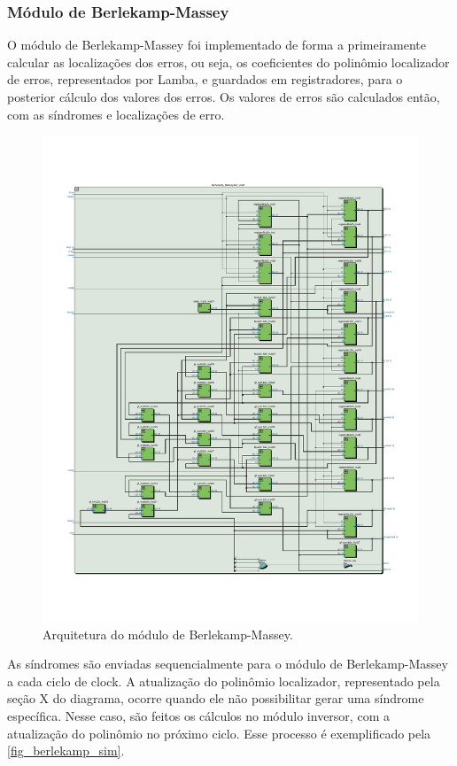 	\subsubsection{Módulo de Berlekamp-Massey}
	
	O módulo de Berlekamp-Massey foi implementado de forma a primeiramente calcular as localizações dos erros, ou seja, os coeficientes do polinômio localizador de erros, representados por Lamba, e guardados em registradores, para o posterior cálculo dos valores dos erros. Os valores de erros são calculados então, com as síndromes e localizações de erro.
	
	\begin{figure}[!htb]
		\caption{\label{fig_berlekamp_arq}Arquitetura do módulo de Berlekamp-Massey.}
		\centering
		\includegraphics[width=1\textwidth]{RS/BerlekampRTL.pdf}
		\legend{}
	\end{figure}
	
	As síndromes são enviadas sequencialmente para o módulo de Berlekamp-Massey a cada ciclo de clock. A atualização do polinômio localizador, representado pela seção X do diagrama, ocorre quando ele não possibilitar gerar uma síndrome específica. Nesse caso, são feitos os cálculos no módulo inversor, com a atualização do polinômio no próximo ciclo. Esse processo é exemplificado pela \autoref{fig_berlekamp_sim}.
	

